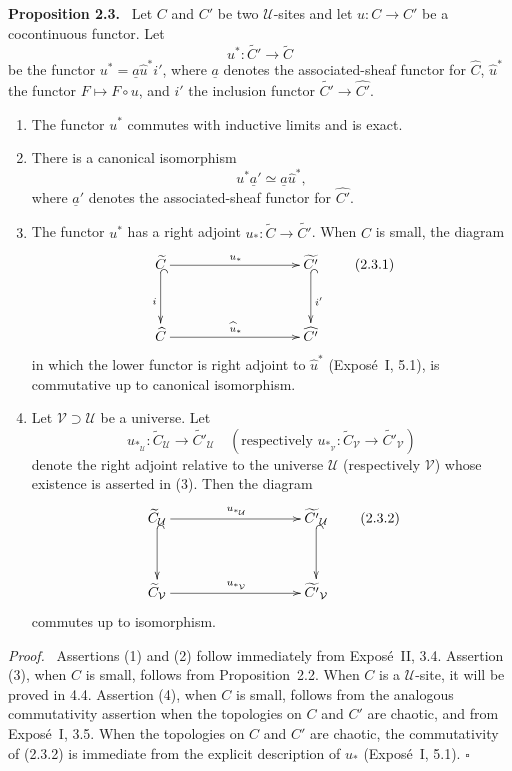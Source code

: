 \documentclass[11pt]{article}
\newcommand{\U}{\mathcal{U}}
\newcommand{\V}{\mathcal{V}}
\newcommand{\qedtext}{\hfill\(\square\)}
\newenvironment{statement}[1]{\par\medskip\noindent\textbf{#1.}\ }{\par\medskip}
\newenvironment{prooftext}{\par\noindent\emph{Proof.}\ }{\par\medskip}
\begin{document}
\begin{statement}{Proposition 2.3}
Let \(C\) and \(C'\) be two \(\U\)-sites and let \(u:C\to C'\) be a cocontinuous functor. Let
\[
u^{\ast}:\widetilde{C'}\to\widetilde C
\]
be the functor \(u^{\ast}=\underline a\widehat u^{\ast}i'\), where \(\underline a\) denotes the associated-sheaf functor for \(\widehat C\), \(\widehat u^{\ast}\) the functor \(F\mapsto F\circ u\), and \(i'\) the inclusion functor \(\widetilde{C'}\to\widehat{C'}\).
\begin{enumerate}[label=\arabic*)]
\item The functor \(u^{\ast}\) commutes with inductive limits and is exact.
\item There is a canonical isomorphism
\[
u^{\ast}\underline a'\simeq\underline a\widehat u^{\ast},
\]
where \(\underline a'\) denotes the associated-sheaf functor for \(\widehat{C'}\).
\item The functor \(u^{\ast}\) has a right adjoint \(u_{\ast}:\widetilde C\to\widetilde{C'}\). When \(C\) is small, the diagram
\[
\xymatrix@C=3.25cm@R=1.25cm{
\widetilde C\ar[r]^{u_{\ast}}\ar@{^{(}->}[d]_{i}& \widetilde{C'}\ar@{^{(}->}[d]^{i'}\\
\widehat C\ar[r]^{\widehat u_{\ast}}& \widehat{C'}
}
\tag{2.3.1}
\]
in which the lower functor is right adjoint to \(\widehat u^{\ast}\) (Expos\'e~I, 5.1), is commutative up to canonical isomorphism.
\item Let \(\V\supset\U\) be a universe. Let
\[
u_{\ast_{\U}}:\widetilde C_{\U}\to\widetilde{C'}_{\U}
\quad(\text{respectively } u_{\ast_{\V}}:\widetilde C_{\V}\to\widetilde{C'}_{\V})
\]
denote the right adjoint relative to the universe \(\U\) (respectively \(\V\)) whose existence is asserted in (3). Then the diagram
\[
\xymatrix@C=3.25cm@R=1.25cm{
\widetilde C_{\U}\ar[r]^{u_{\ast_{\U}}}\ar@{^{(}->}[d]& \widetilde{C'}_{\U}\ar@{^{(}->}[d]\\
\widetilde C_{\V}\ar[r]^{u_{\ast_{\V}}}& \widetilde{C'}_{\V}
}
\tag{2.3.2}
\]
commutes up to isomorphism.
\end{enumerate}
\end{statement}

\begin{prooftext}
Assertions (1) and (2) follow immediately from Expos\'e~II, 3.4. Assertion (3), when \(C\) is small, follows from Proposition~2.2. When \(C\) is a \(\U\)-site, it will be proved in 4.4. Assertion (4), when \(C\) is small, follows from the analogous commutativity assertion when the topologies on \(C\) and \(C'\) are chaotic, and from Expos\'e~I, 3.5. When the topologies on \(C\) and \(C'\) are chaotic, the commutativity of (2.3.2) is immediate from the explicit description of \(u_{\ast}\) (Expos\'e~I, 5.1). \qedtext
\end{prooftext}
\end{document}
